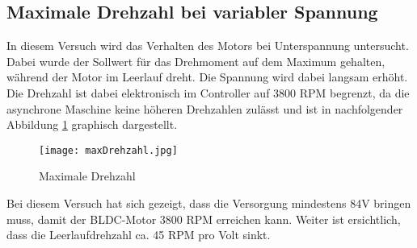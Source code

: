 \subsection{Maximale Drehzahl bei variabler Spannung}\label{subsec:DrehzahlSpanungsabfall}
In diesem Versuch wird das Verhalten des Motors bei Unterspannung untersucht. Dabei wurde der Sollwert für das Drehmoment auf dem Maximum gehalten, während der Motor im Leerlauf dreht. Die Spannung wird dabei langsam erhöht. Die Drehzahl ist dabei elektronisch im Controller auf 3800 RPM begrenzt, da die asynchrone Maschine keine höheren Drehzahlen zulässt und ist in nachfolgender Abbildung \ref{fig:maxDrehzahl} graphisch dargestellt.

\begin{figure}[H]
	\centering
	\texttt{[image: maxDrehzahl.jpg]}
	\caption{Maximale Drehzahl}\label{fig:maxDrehzahl}
\end{figure}

Bei diesem Versuch hat sich gezeigt, dass die Versorgung mindestens 84V bringen muss, damit der BLDC-Motor 3800 RPM erreichen kann. Weiter ist ersichtlich, dass die Leerlaufdrehzahl ca. 45 RPM pro Volt sinkt.

